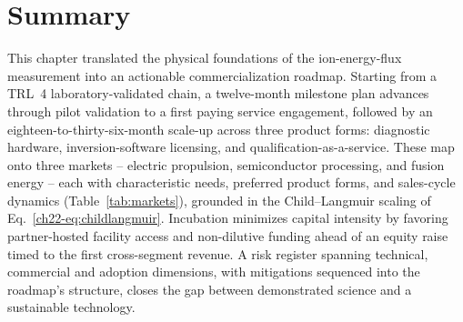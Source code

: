\section{Summary}

This chapter translated the physical foundations of the ion-energy-flux measurement into an actionable commercialization roadmap. Starting from a TRL~4 laboratory-validated chain, a twelve-month milestone plan advances through pilot validation to a first paying service engagement, followed by an eighteen-to-thirty-six-month scale-up across three product forms: diagnostic hardware, inversion-software licensing, and qualification-as-a-service. These map onto three markets -- electric propulsion, semiconductor processing, and fusion energy -- each with characteristic needs, preferred product forms, and sales-cycle dynamics (Table~\ref{tab:markets}), grounded in the Child--Langmuir scaling of Eq.~\eqref{ch22-eq:childlangmuir}. Incubation minimizes capital intensity by favoring partner-hosted facility access and non-dilutive funding ahead of an equity raise timed to the first cross-segment revenue. A risk register spanning technical, commercial and adoption dimensions, with mitigations sequenced into the roadmap's structure, closes the gap between demonstrated science and a sustainable technology.
